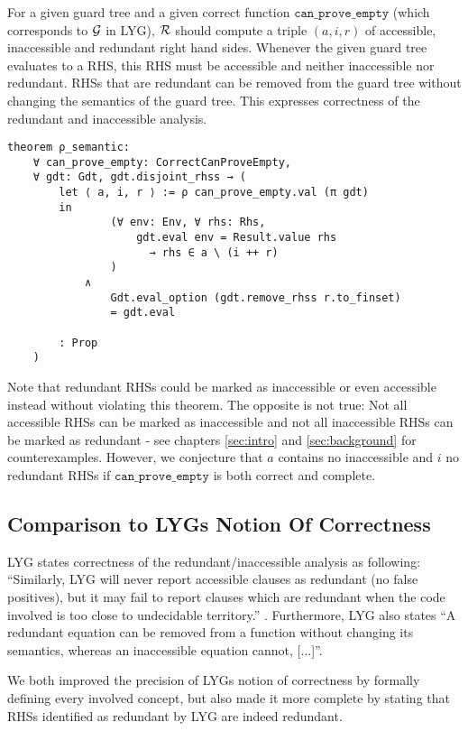 For a given guard tree and a given correct function $\mathtt{can\_prove\_empty}$ (which corresponds to $\mathcal{G}$ in LYG), $\mathcal{R}$
should compute a triple $(a, i, r)$ of accessible, inaccessible and redundant right hand sides.
Whenever the given guard tree evaluates to a RHS, this RHS must be accessible and neither inaccessible nor redundant.
RHSs that are redundant can be removed from the guard tree without changing the semantics of the guard tree.
This expresses correctness of the redundant and inaccessible analysis.

\begin{verbatim}
theorem ρ_semantic:
    ∀ can_prove_empty: CorrectCanProveEmpty,
    ∀ gdt: Gdt, gdt.disjoint_rhss → (
        let ⟨ a, i, r ⟩ := ρ can_prove_empty.val (π gdt)
        in
                (∀ env: Env, ∀ rhs: Rhs,
                    gdt.eval env = Result.value rhs
                      → rhs ∈ a \ (i ++ r)
                )
            ∧
                Gdt.eval_option (gdt.remove_rhss r.to_finset)
                = gdt.eval

        : Prop
    )
\end{verbatim}

Note that redundant RHSs could be marked as inaccessible or even accessible instead without violating this theorem.
The opposite is not true: Not all accessible RHSs can be marked as inaccessible and not all inaccessible RHSs can be marked as redundant - see chapters \ref{sec:intro} and \ref{sec:background} for counterexamples. However, we conjecture that $a$ contains no inaccessible and $i$ no redundant RHSs if $\mathtt{can\_prove\_empty}$ is both correct and complete.

\subsection{Comparison to LYGs Notion Of Correctness}

LYG states correctness of the redundant/inaccessible analysis as following:
``Similarly, LYG will never report accessible clauses as
redundant (no false positives), but it may fail to report clauses which are redundant when the code
involved is too close to undecidable territory.'' \cite{10.1145/3408989}.
Furthermore, LYG also states
``A redundant equation can be removed from a
function without changing its semantics, whereas an inaccessible equation cannot, [...]''.

We both improved the precision of LYGs notion of correctness by formally defining every involved concept,
but also made it more complete by stating that RHSs identified as redundant by LYG are indeed redundant.
